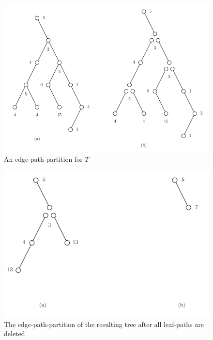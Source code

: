 \begin{figure}[thb]
\begin{center}
\includegraphics[scale=0.9]{tfig2p3}
\end{center}
\caption{\small An edge-path-partition for $T$}
\label{tfig2p3}
\end{figure}

\begin{figure}[thb]
\begin{center}
\includegraphics{tfig2p4}
\end{center}
\caption{\small The edge-path-partition of the resulting tree after all leaf-paths are deleted}
\label{tfig2p4}
\end{figure}


